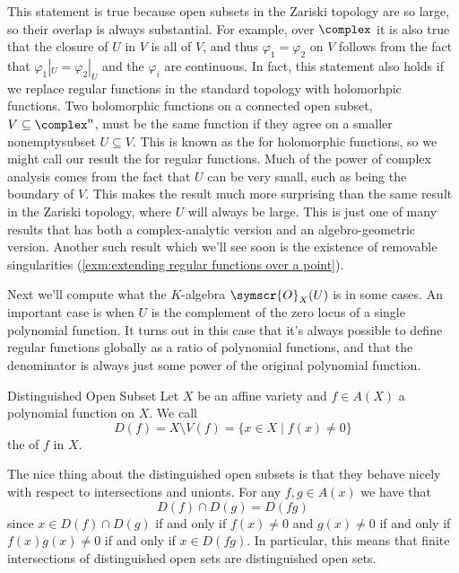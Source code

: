 \documentclass[fleqn]{NotesClass}
\newcommand{\sheaf}[1]{\symscr{#1}}
\begin{document}
    This statement is true because open subsets in the Zariski topology are so large, so their overlap is always substantial.
    For example, over \(\complex\) it is also true that the closure of \(U\) in \(V\) is all of \(V\), and thus \(\varphi_1 = \varphi_2\) on \(V\) follows from the fact that \(\varphi_1|_U = \varphi_2|_U\) and the \(\varphi_i\) are continuous.
    In fact, this statement also holds if we replace regular functions in the standard topology with holomorhpic functions.
    Two holomorphic functions on a connected open subset, \(V \subseteq \complex^n\), must be the same function if they agree on a smaller nonemptysubset \(U \subseteq V\).
    This is known as the  for holomorphic functions, so we might call our result the  for regular functions.
    Much of the power of complex analysis comes from the fact that \(U\) can be very small, such as being the boundary of \(V\).
    This makes the result much more surprising than the same result in the Zariski topology, where \(U\) will always be large.
    This is just one of many results that has both a complex-analytic version and an algebro-geometric version.
    Another such result which we'll see soon is the existence of removable singularities (\cref{exm:extending regular functions over a point}).
    
    Next we'll compute what the \(K\)-algebra \(\sheaf{O}_X(U)\) is in some cases.
    An important case is when \(U\) is the complement of the zero locus of a single polynomial function.
    It turns out in this case that it's always possible to define regular functions globally as a ratio of polynomial functions, and that the denominator is always just some power of the original polynomial function.
    
    \begin{dfn}{Distinguished Open Subset}{}
        Let \(X\) be an affine variety and \(f \in A(X)\) a polynomial function on \(X\).
        We call
        \begin{equation}
            D(f) = X \setminus V(f) = \{x \in X \mid f(x) \ne 0\}
        \end{equation}
        the  of \(f\) in \(X\).
    \end{dfn}
    
    The nice thing about the distinguished open subsets is that they behave nicely with respect to intersections and unionts.
    For any \(f, g \in A(x)\) we have that
    \begin{equation}
        D(f) \cap D(g) = D(fg)
    \end{equation}
    since \(x \in D(f) \cap D(g)\) if and only if \(f(x) \ne 0\) and \(g(x) \ne 0\) if and only if \(f(x)g(x) \ne 0\) if and only if \(x \in D(fg)\).
    In particular, this means that finite intersections of distinguished open sets are distinguished open sets.
    
\end{document}
